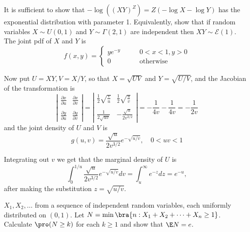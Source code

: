 \begin{solution}[\bf Solution.]
It is sufficient to show that $-\log \left((XY)^Z\right)=Z(-\log X - \log Y)$ has the exponential distribution with parameter 1. Equivalently, show that if random variables $X\sim U(0,1)$ and $Y\sim \Gamma(2,1)$ are independent then $XY\sim\mathcal{E}(1)$. The joint pdf of $X$ and $Y$ is
\begin{equation}
f(x,y)=\left\{\begin{array}{ll}
ye^{-y} \quad\quad &  0<x<1, y>0 \\
0 & \text{otherwise}
\end{array}\right.
\end{equation}

Now put $U=XY,V=X/Y$, so that $X=\sqrt{UV}$ and $Y=\sqrt{U/V}$, and the Jacobian of the transformation is
\begin{equation}
\left|\begin{array}{cc}
\frac{\partial x}{\partial u} & \frac{\partial x}{\partial v}\\
 & \\
\frac{\partial y}{\partial u} & \frac{\partial y}{\partial v}
\end{array}\right|=
\left|\begin{array}{cc}
\frac 12\sqrt{\frac{v}{u}} & \frac 12\sqrt{\frac{u}{v}} \\
& \\
\frac 1{2\sqrt{uv}} & -\frac{\sqrt{u}}{2v^{3/2}}
\end{array}\right| = -\frac{1}{4v} - \frac{1}{4v} =  -\frac{1}{2v}
\end{equation}
and the joint density of $U$ and $V$ is
\begin{equation}
g(u,v)=\frac{\sqrt{u}}{2v^{3/2}}e^{-\sqrt{u/v}}, \quad 0<uv<1
\end{equation}

Integrating out $v$ we get that the marginal density of $U$ is
\begin{equation}
\int^{1/u}_0\frac{\sqrt{u}}{2v^{3/2}}e^{-\sqrt{u/v}}dv = \int^\infty_u e^{-z}dz = e^{-u},
\end{equation}
after making the substitution $z=\sqrt{u/v}$.
\end{solution}

\begin{problem}
$X_1,X_2,\dots$ from a sequence of independent random variables, each uniformly distributed on $(0,1)$. Let $N=\min\bra{n:X_1+X_2+\cdots+X_n\geq 1}$. Calculate $\pro(N\geq k)$ for each $k\geq 1$ and show that $\E N=e$.
\end{problem}

